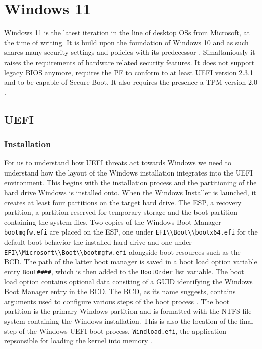

\chapter{Windows 11}

Windows 11 is the latest iteration in the line of desktop \acp{OS} from Microsoft, at the time of writing.
It is build upon the foundation of Windows 10 and as such shares many security settings and policies with its predecessor \cite{microsoft-windows-11-overview}.
Simaltaniously it raises the requirements of hardware related security features.
It does not support legacy \ac{BIOS} anymore, requires the \ac{PF} to conform to at least \ac{UEFI} version 2.3.1 and to be capable of Secure Boot.
It also requires the presence a \ac{TPM} version 2.0 \cite{microsoft-windows-minimum-hardware-requirements-overview}.


\section{\acs{UEFI}}


\subsection{Installation}

For us to understand how UEFI threats act towards Windows we need to understand how the layout of the Windows installation integrates into the UEFI environment.
This begins with the installation process and the partitioning of the hard drive Windows is installed onto.
When the Windows Installer is launched, it creates at least four partitions on the target hard drive.
The \acf{ESP}, a recovery partition, a partition reserved for temporary storage and the boot partition containing the system files.
Two copies of the Windows Boot Manager \lstinline{bootmgfw.efi} are placed on the \ac{ESP}, one under \lstinline{EFI\\Boot\\bootx64.efi} for the default boot behavior the installed hard drive and one under \lstinline{EFI\\Microsoft\\Boot\\bootmgfw.efi} alongside boot resources such as the \ac{BCD}.
The path of the latter boot manager is saved in a boot load option variable entry \lstinline{Boot####}, which is then added to the \lstinline{BootOrder} list variable.
The boot load option contains optional data consiting of a GUID identifying the Windows Boot Manager entry in the \ac{BCD}.
The \ac{BCD}, as its name suggests, contains arguments used to configure various steps of the boot process \cite[Section 12]{windows-internals-7-part2}.
The boot partition is the primary Windows partition and is formatted with the \ac{NTFS} file system containing the Windows installation.
This is also the location of the final step of the Windows UEFI boot process, \lstinline{Windload.efi}, the application repsonsible for loading the kernel into memory \cite[12. The Windows OS Loader]{windows-internals-7-part2}.

